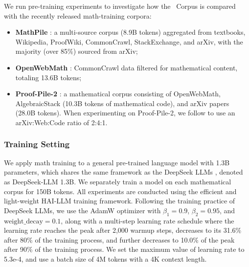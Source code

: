 We run pre-training experiments to investigate how the \spmath~Corpus is compared with the recently released math-training corpora:
\begin{itemize}[topsep=0pt]
    \item \textbf{MathPile} \citep{mathpile}: a multi-source corpus (8.9B tokens) aggregated from textbooks, Wikipedia, ProofWiki, CommonCrawl, StackExchange, and arXiv, with the majority (over 85\%) sourced from arXiv;
    \item \textbf{OpenWebMath} \citep{openwebmath}: CommonCrawl data filtered for mathematical content, totaling 13.6B tokens;
    \item \textbf{Proof-Pile-2} \citep{llemma}: a mathematical corpus consisting of OpenWebMath, AlgebraicStack (10.3B tokens of mathematical code), and arXiv papers (28.0B tokens).
    When experimenting on Proof-Pile-2, we follow \cite{llemma} to use an arXiv:Web:Code ratio of 2:4:1.
\end{itemize}

\subsubsection{Training Setting}
\label{sec:quality-policy}
We apply math training to a general pre-trained language model with 1.3B parameters, which shares the same framework as the DeepSeek LLMs \citep{deepseek-llm}, denoted as DeepSeek-LLM 1.3B.
We separately train a model on each mathematical corpus for 150B tokens. All experiments are conducted using the efficient and light-weight HAI-LLM \citep{haillm} training framework.
Following the training practice of DeepSeek LLMs, we use the AdamW optimizer \citep{adamW} with $\beta_1=0.9$, $\beta_2=0.95$, and $\mathrm{weight\_decay}=0.1$, along with a multi-step learning rate schedule where the learning rate reaches the peak after 2,000 warmup steps, decreases to its 31.6\% after 80\% of the training process, and further decreases to 10.0\% of the peak after 90\% of the training process.
We set the maximum value of learning rate to 5.3e-4, and use a batch size of 4M tokens with a 4K context length.


